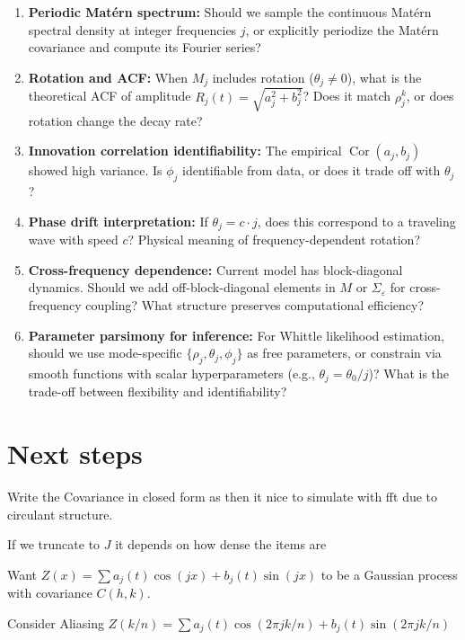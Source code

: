 \documentclass[answers,12pt,addpoints]{exam}
\begin{document}
\begin{enumerate}
  \item \textbf{Periodic Matérn spectrum:} Should we sample the continuous Matérn spectral density at integer frequencies $j$, or explicitly periodize the Matérn covariance and compute its Fourier series?
  
  \item \textbf{Rotation and ACF:} When $M_j$ includes rotation ($\theta_j \neq 0$), what is the theoretical ACF of amplitude $R_j(t) = \sqrt{a_j^2 + b_j^2}$? Does it match $\rho_j^k$, or does rotation change the decay rate?
  
  \item \textbf{Innovation correlation identifiability:} The empirical $\operatorname{Cor}(a_j, b_j)$ showed high variance. Is $\phi_j$ identifiable from data, or does it trade off with $\theta_j$?
  
  \item \textbf{Phase drift interpretation:} If $\theta_j = c \cdot j$, does this correspond to a traveling wave with speed $c$? Physical meaning of frequency-dependent rotation?
  
  \item \textbf{Cross-frequency dependence:} Current model has block-diagonal dynamics. Should we add off-block-diagonal elements in $M$ or $\Sigma_\varepsilon$ for cross-frequency coupling? What structure preserves computational efficiency?
  
  \item \textbf{Parameter parsimony for inference:} For Whittle likelihood estimation, should we use mode-specific $\{\rho_j, \theta_j, \phi_j\}$ as free parameters, or constrain via smooth functions with scalar hyperparameters (e.g., $\theta_j = \theta_0/j$)? What is the trade-off between flexibility and identifiability?
\end{enumerate}

\section{Next steps}
Write the Covariance in closed form as then it nice to simulate with fft due to circulant structure. 

If we truncate to $J$ it depends on how dense the items are

Want $Z(x) = \sum a_j(t) \cos(jx) + b_j(t) \sin(jx)$ to be a Gaussian process with covariance $C(h,k)$.

Consider Aliasing 
$Z(k/n) = \sum a_j(t) \cos(2\pi jk/n) + b_j(t) \sin(2\pi jk/n)$
\end{document}
